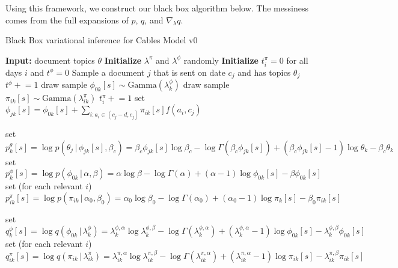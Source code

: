 \documentclass{article}
\newcommand{\pluseq}{\mathrel{+}=}
\newcommand{\g}{\, | \,}
\begin{document}
Using this framework, we construct our black box algorithm below.  The messiness comes from the full expansions of $p$, $q$, and $\nabla_\lambda q$.


\begin{algorithm}[h]
\small
\caption{Black Box variational inference for Cables Model v0}
\label{alg:SPF}
\begin{algorithmic}[1]
\State \textbf{Input:} document topics $\theta$
\State \textbf{Initialize} $\lambda^\pi$ and $\lambda^\phi$ randomly
\State \textbf{Initialize} $t^\pi_i = 0$ for all days $i$ and $t^\phi = 0$
\Repeat
	\State Sample a document $j$ that is sent on date $c_j$ and has topics $\theta_j$
	\State $t^\phi \pluseq 1$
			\State draw sample $\phi_{0k}[s] \sim \mbox{Gamma}(\lambda^\phi_{k})$ 
			\For {each event $i$ on date $a_i \in \left( c_j - d, c_j \right]$}
				\State draw sample $\pi_{ik}[s] \sim \mbox{Gamma}(\lambda^\pi_{ik})$
				\State $t^\pi_i \pluseq 1$
			\EndFor
			\State set $\phi_{jk}[s] = \phi_{0k}[s] + \sum_{i : a_i \in \left( c_j - d, c_j \right]} \pi_{ik}[s] f(a_i, c_j)$
			
			\State set $p^\theta_k[s] = \log p(\theta_j \g \phi_{jk}[s], \beta_c) = \beta_c \phi_{jk}[s] \log \beta_c - \log\Gamma(\beta_c \phi_{jk}[s]) + (\beta_c \phi_{jk}[s] - 1) \log \theta_k - \beta_c \theta_k$
			\State set $p^\phi_k[s] = \log p(\phi_{0k} \g \alpha, \beta) = \alpha \log \beta - \log\Gamma(\alpha) + (\alpha - 1) \log \phi_{0k}[s] - \beta \phi_{0k}[s]$
			\State set (for each relevant $i$) $p^\pi_{ik}[s] = \log p(\pi_{ik} \g \alpha_0, \beta_0) = \alpha_0 \log \beta_0 - \log\Gamma(\alpha_0) + (\alpha_0 - 1) \log \pi_{k}[s] - \beta_0 \pi_{ik}[s]$
			
			\State set $q^\phi_k[s] = \log q(\phi_{0k} \g \lambda^\phi_k) = \lambda^{\phi,\alpha}_k \log  \lambda^{\phi,\beta}_k - \log\Gamma( \lambda^{\phi,\alpha}_k) + ( \lambda^{\phi,\alpha}_k - 1) \log \phi_{0k}[s] -  \lambda^{\phi,\beta}_k \phi_{0k}[s]$
			\State set (for each relevant $i$) $q^\pi_{ik}[s] = \log q(\pi_{ik} \g \lambda^\pi_{ik}) = \lambda^{\pi,\alpha}_{ik} \log \lambda^{\pi,\beta}_{ik} - \log\Gamma(\lambda^{\pi,\alpha}_{ik}) + (\lambda^{\pi,\alpha}_{ik} - 1) \log \pi_{ik}[s] - \lambda^{\pi,\beta}_{ik} \pi_{ik}[s]$
			

\end{algorithmic}
\end{algorithm}
\end{document}
